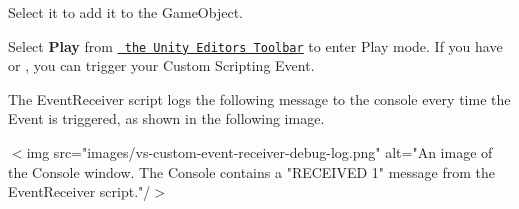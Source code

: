 \begin{DoxyEnumerate}
\item Select it to add it to the Game\+Object.
\end{DoxyEnumerate}
\begin{DoxyEnumerate}
\item Select {\bfseries{Play}} from \href{https://docs.unity3d.com/Manual/Toolbar.html}{\texttt{ the Unity Editor\textquotesingle{}s Toolbar}} to enter Play mode. If you have  or , you can trigger your Custom Scripting Event.

The {\ttfamily Event\+Receiver} script logs the following message to the console every time the Event is triggered, as shown in the following image.

\texorpdfstring{$<$}{<}img src="{}images/vs-\/custom-\/event-\/receiver-\/debug-\/log.\+png"{} alt="{}\+An image of the Console window. The Console contains a "{}RECEIVED 1"{} message from the Event\+Receiver script."{}/\texorpdfstring{$>$}{>} 
\end{DoxyEnumerate}